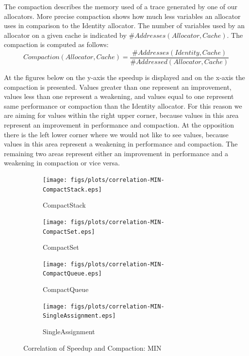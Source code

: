 \documentclass[onecolumn, openright, master, english, signatures]{dbrgrptt}
\begin{document}
The compaction describes the memory used of a \ac{trace} generated by one of our allocators. More precise compaction shows how much less variables an allocator uses in comparison to the Identity allocator. The number of variables used by an allocator on a given cache is indicated by $\#Addresses(Allocator, Cache)$. The compaction is computed as follows:
$$Compaction(Allocator, Cache) = \frac{\#Addresses(Identity, Cache)}{\#Addressed(Allocator, Cache)}$$

At the figures below on the y-axis the speedup is displayed and on the x-axis the compaction is presented. Values greater than one represent an improvement, values less than one represent a weakening, and values equal to one represent same performance or compaction than the Identity allocator. For this reason we are aiming for values within the right upper corner, because values in this area represent an improvement in performance and compaction. At the opposition there is the left lower corner where we would not like to see values, because values in this area represent a weakening in performance and compaction. The remaining two areas represent either an improvement in performance and a weakening in compaction or vice versa.

\begin{figure}[!ht]
  \begin{subfigure}[b]{0.5\textwidth}%
    \texttt{[image: figs/plots/correlation-MIN-CompactStack.eps]}
    \caption{CompactStack}
    \label{fig:correlation-min-compactstack}
  \end{subfigure}%
  \begin{subfigure}[b]{0.5\textwidth}%
    \texttt{[image: figs/plots/correlation-MIN-CompactSet.eps]}
    \caption{CompactSet}
    \label{fig:correlation-min-compactset}
  \end{subfigure}%
  \qquad
  \begin{subfigure}[b]{0.5\textwidth}%
    \texttt{[image: figs/plots/correlation-MIN-CompactQueue.eps]}
    \caption{CompactQueue}
    \label{fig:correlation-min-compactqueue}
  \end{subfigure}%
  \begin{subfigure}[b]{0.5\textwidth}%
    \texttt{[image: figs/plots/correlation-MIN-SingleAssignment.eps]}
    \caption{SingleAssignment}
    \label{fig:correlation-min-singleassignment}
  \end{subfigure}%
  \caption{Correlation of Speedup and Compaction: \ac{MIN}}
  \label{fig:correlation-min}
\end{figure}
\end{document}
